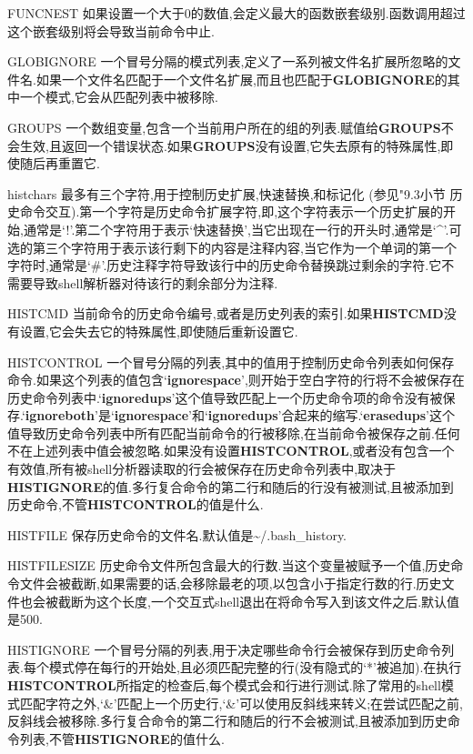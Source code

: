 \documentclass[draft,openany]{book}
\begin{document}
\begin{CJK}{UTF8}{gbsn}
\begin{basedescript}{\desclabelstyle{\nextlinelabel}\desclabelwidth{2.5em}}
    \item[FUNCNEST] 如果设置一个大于0的数值,会定义最大的函数嵌套级别.函数调用超过这个嵌套级别将会导致当前命令中止.
    \item[GLOBIGNORE] 一个冒号分隔的模式列表,定义了一系列被文件名扩展所忽略的文件名.如果一个文件名匹配于一个文件名扩展,而且也匹配于\textbf{GLOBIGNORE}的其中一个模式,它会从匹配列表中被移除.
    \item[GROUPS] 一个数组变量,包含一个当前用户所在的组的列表.赋值给\textbf{GROUPS}不会生效,且返回一个错误状态.如果\textbf{GROUPS}没有设置,它失去原有的特殊属性,即使随后再重置它.
    \item[histchars] 最多有三个字符,用于控制历史扩展,快速替换,和标记化 (参见"9.3小节 历史命令交互).第一个字符是历史命令扩展字符,即,这个字符表示一个历史扩展的开始,通常是`!'.第二个字符用于表示`快速替换',当它出现在一行的开头时,通常是`\^{}'.可选的第三个字符用于表示该行剩下的内容是注释内容,当它作为一个单词的第一个字符时,通常是`\#'.历史注释字符导致该行中的历史命令替换跳过剩余的字符.它不需要导致shell解析器对待该行的剩余部分为注释.
    \item[HISTCMD] 当前命令的历史命令编号,或者是历史列表的索引.如果\textbf{HISTCMD}没有设置,它会失去它的特殊属性,即使随后重新设置它.
    \item[HISTCONTROL] 一个冒号分隔的列表,其中的值用于控制历史命令列表如何保存命令.如果这个列表的值包含`\textbf{ignorespace}',则开始于空白字符的行将不会被保存在历史命令列表中.`\textbf{ignoredups}'这个值导致匹配上一个历史命令项的命令没有被保存.`\textbf{ignoreboth}'是`\textbf{ignorespace}'和`\textbf{ignoredups}'合起来的缩写.`\textbf{erasedups}'这个值导致历史命令列表中所有匹配当前命令的行被移除,在当前命令被保存之前.任何不在上述列表中值会被忽略.如果没有设置\textbf{HISTCONTROL},或者没有包含一个有效值,所有被shell分析器读取的行会被保存在历史命令列表中,取决于\textbf{HISTIGNORE}的值.多行复合命令的第二行和随后的行没有被测试,且被添加到历史命令,不管\textbf{HISTCONTROL}的值是什么.
    \item[HISTFILE] 保存历史命令的文件名.默认值是\~{}/.bash\_history.
    \item[HISTFILESIZE] 历史命令文件所包含最大的行数.当这个变量被赋予一个值,历史命令文件会被截断,如果需要的话,会移除最老的项,以包含小于指定行数的行.历史文件也会被截断为这个长度,一个交互式shell退出在将命令写入到该文件之后.默认值是500.
    \item[HISTIGNORE] 一个冒号分隔的列表,用于决定哪些命令行会被保存到历史命令列表.每个模式停在每行的开始处,且必须匹配完整的行(没有隐式的`*'被追加).在执行\textbf{HISTCONTROL}所指定的检查后,每个模式会和行进行测试.除了常用的shell模式匹配字符之外,`\&'匹配上一个历史行,`\&'可以使用反斜线来转义;在尝试匹配之前,反斜线会被移除.多行复合命令的第二行和随后的行不会被测试,且被添加到历史命令列表,不管\textbf{HISTIGNORE}的值什么.\par

\end{basedescript}
\end{CJK}
\end{document}
